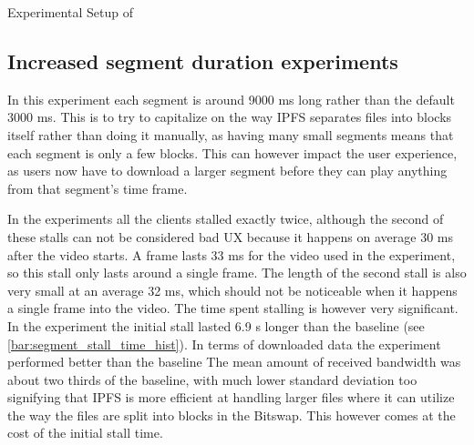 \begin{table}[!htbp]
    \myfloatalign
    \caption[Experimental Setup of Segment size]{Experimental Setup of }
    \label{tab:exp_overview_video}
    
\end{table}

\subsection{Increased segment duration experiments}
\label{sec:eval_segment}

In this experiment each segment is around 9000 \ac{ms} long rather than the default 3000 \ac{ms}. This is to try to capitalize on the way \ac{IPFS} separates files into blocks itself rather than doing it manually, as having many small segments means that each segment is only a few blocks. This can however impact the user experience, as users now have to download a larger segment before they can play anything from that segment's time frame.

In the experiments all the clients stalled exactly twice, although the second of these stalls can not be considered bad \ac{UX} because it happens on average 30 \ac{ms} after the video starts. A frame lasts 33 \ac{ms} for the video used in the experiment, so this stall only lasts around a single frame. The length of the second stall is also very small at an average 32 \ac{ms}, which should not be noticeable when it happens a single frame into the video. The time spent stalling is however very significant. In the experiment the initial stall lasted 6.9 \ac{s} longer than the baseline (see \autoref{bar:segment_stall_time_hist}). In terms of downloaded data the experiment performed better than the baseline The mean amount of received bandwidth was about two thirds of the baseline, with much lower standard deviation too signifying that \ac{IPFS} is more efficient at handling larger files where it can utilize the way the files are split into blocks in the Bitswap. This however comes at the cost of the initial stall time.

\if{}


\fi

